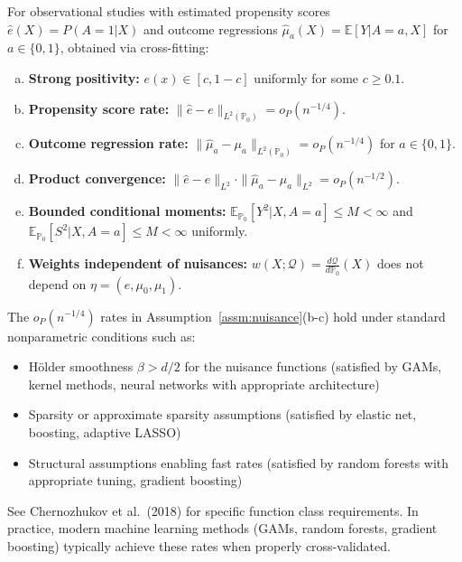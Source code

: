 \begin{assumption}
\label{assm:nuisance}
For observational studies with estimated propensity scores $\hat{e}(X) = P(A=1|X)$ and outcome regressions $\hat{\mu}_a(X) = \mathbb{E}[Y|A=a,X]$ for $a \in \{0,1\}$, obtained via cross-fitting:
\begin{enumerate}[(a)]
\item \textbf{Strong positivity:} $e(x) \in [c, 1-c]$ uniformly for some $c \geq 0.1$.
\item \textbf{Propensity score rate:} $\|\hat{e} - e\|_{L^2(\mathbb{P}_0)} = o_P(n^{-1/4})$.
\item \textbf{Outcome regression rate:} $\|\hat{\mu}_a - \mu_a\|_{L^2(\mathbb{P}_0)} = o_P(n^{-1/4})$ for $a \in \{0,1\}$.
\item \textbf{Product convergence:} $\|\hat{e} - e\|_{L^2} \cdot \|\hat{\mu}_a - \mu_a\|_{L^2} = o_P(n^{-1/2})$.
\item \textbf{Bounded conditional moments:} $\mathbb{E}_{\mathbb{P}_0}[Y^2 | X, A=a] \leq M < \infty$ and $\mathbb{E}_{\mathbb{P}_0}[S^2 | X, A=a] \leq M < \infty$ uniformly.
\item \textbf{Weights independent of nuisances:} $w(X; \mathcal{Q}) = \frac{d\mathcal{Q}}{d\mathbb{P}_0}(X)$ does not depend on $\eta = (e, \mu_0, \mu_1)$.
\end{enumerate}
\end{assumption}

\begin{remark}
The $o_P(n^{-1/4})$ rates in Assumption~\ref{assm:nuisance}(b-c) hold under standard nonparametric conditions such as:
\begin{itemize}
\item Hölder smoothness $\beta > d/2$ for the nuisance functions (satisfied by GAMs, kernel methods, neural networks with appropriate architecture)
\item Sparsity or approximate sparsity assumptions (satisfied by elastic net, boosting, adaptive LASSO)
\item Structural assumptions enabling fast rates (satisfied by random forests with appropriate tuning, gradient boosting)
\end{itemize}
See Chernozhukov et al.\ (2018) for specific function class requirements. In practice, modern machine learning methods (GAMs, random forests, gradient boosting) typically achieve these rates when properly cross-validated.
\end{remark}

